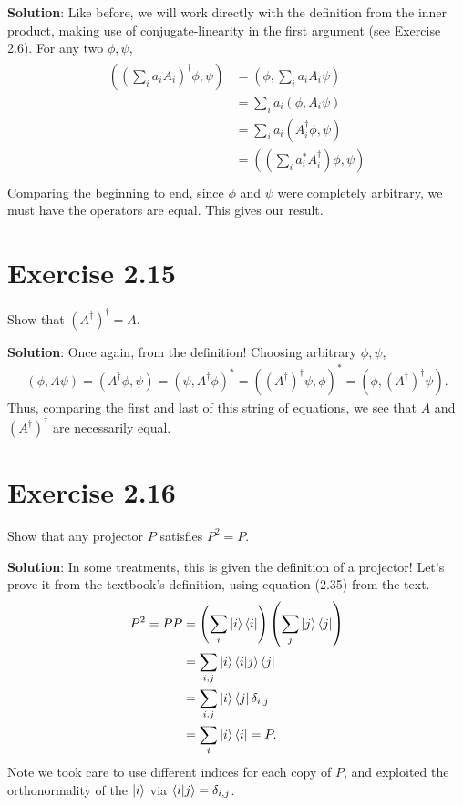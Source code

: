 \documentclass{book}
\begin{document}
    \textbf{Solution}: Like before, we will work directly with the definition from the inner product, making use of conjugate-linearity in the first argument (see Exercise 2.6). For any two $\phi, \psi$,
    \begin{align}
    \begin{aligned}
        ( (\sum_i a_i A_i)^\dagger \phi, \psi) &= (\phi, \sum_i a_i A_i \psi) \\
        &= \sum_i a_i (\phi, A_i \psi) \\
        &=\sum_i a_i (A_i^\dagger \phi, \psi) \\
        &= ((\sum_i a_i^* A_i^\dagger) \phi, \psi) \\
    \end{aligned}
    \end{align}
    Comparing the beginning to end, since $\phi$ and $\psi$ were completely arbitrary, we must have the operators are equal. This gives our result.
    
\section*{Exercise 2.15}
    Show that $(A^\dagger)^\dagger = A$.
    
    \textbf{Solution}: Once again, from the definition! Choosing arbitrary $\phi, \psi$,
    \begin{align}
        (\phi, A\psi) = (A^\dagger \phi, \psi) = (\psi, A^\dagger\phi)^* = ((A^\dagger)^\dagger \psi, \phi)^* = (\phi, (A^\dagger)^\dagger \psi).
    \end{align}
    Thus, comparing the first and last of this string of equations, we see that $A$ and $(A^\dagger)^\dagger$ are necessarily equal.
    
\section*{Exercise 2.16}
    Show that any projector $P$ satisfies $P^2 = P$.
    
    \textbf{Solution}: In some treatments, this is given the definition of a projector! Let's prove it from the textbook's definition, using equation (2.35) from the text.
    \begin{align}
    \begin{aligned}
        P^2 = P P &= \left(\sum_i \ket{i}\bra{i}\right)\left(\sum_j \ket{j}\bra{j}\right) \\ 
        &= \sum_{i,j} \ket{i}\bra{i}\ket{j}\bra{j} \\
        &= \sum_{i,j} \ket{i}\bra{j} \delta_{i,j} \\
        &= \sum_{i} \ket{i}\bra{i} = P.
    \end{aligned}
    \end{align}
    Note we took care to use different indices for each copy of $P$, and exploited the orthonormality of the $\ket{i}$ via $\braket{i}{j} = \delta_{i,j}$.
    
\end{document}
